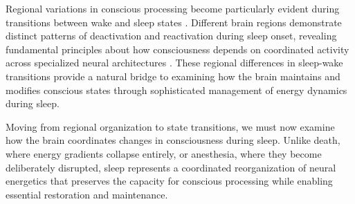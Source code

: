 Regional variations in conscious processing become particularly evident during transitions between wake and sleep states \cite{Dehaene2006}. Different brain regions demonstrate distinct patterns of deactivation and reactivation during sleep onset, revealing fundamental principles about how consciousness depends on coordinated activity across specialized neural architectures \cite{Fox2005}. These regional differences in sleep-wake transitions provide a natural bridge to examining how the brain maintains and modifies conscious states through sophisticated management of energy dynamics during sleep.

Moving from regional organization to state transitions, we must now examine how the brain coordinates changes in consciousness during sleep. Unlike death, where energy gradients collapse entirely, or anesthesia, where they become deliberately disrupted, sleep represents a coordinated reorganization of neural energetics that preserves the capacity for conscious processing while enabling essential restoration and maintenance.
